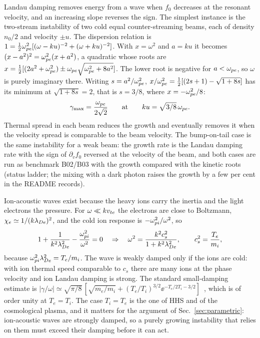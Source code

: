 Landau damping removes energy from a wave when $f_0$ decreases at the resonant velocity, and an increasing slope reverses the sign. The simplest instance is the two-stream instability of two cold equal counter-streaming beams, each of density $n_0/2$ and velocity $\pm u$. The dispersion relation is $1=\tfrac12\omega_{pe}^2[(\omega-ku)^{-2}+(\omega+ku)^{-2}]$. With $x=\omega^2$ and $a=ku$ it becomes $(x-a^2)^2=\omega_{pe}^2(x+a^2)$, a quadratic whose roots are $x=\tfrac12[(2a^2+\omega_{pe}^2)\pm\omega_{pe}\sqrt{\omega_{pe}^2+8a^2}]$. The lower root is negative for $a<\omega_{pe}$, so $\omega$ is purely imaginary there. Writing $s=a^2/\omega_{pe}^2$, $x/\omega_{pe}^2=\tfrac12[(2s+1)-\sqrt{1+8s}]$ has its minimum at $\sqrt{1+8s}=2$, that is $s=3/8$, where $x=-\omega_{pe}^2/8$:
\begin{equation}
\gamma_{\max}=\frac{\omega_{pe}}{2\sqrt2}\qquad\text{at}\qquad ku=\sqrt{3/8}\,\omega_{pe} .
\end{equation}
Thermal spread in each beam reduces the growth and eventually removes it when the velocity spread is comparable to the beam velocity. The bump-on-tail case is the same instability for a weak beam: the growth rate is the Landau damping rate with the sign of $\partial_vf_0$ reversed at the velocity of the beam, and both cases are run as benchmark B02/B03 with the growth compared with the kinetic roots (status ladder; the mixing with a dark photon raises the growth by a few per cent in the README records).

Ion-acoustic waves exist because the heavy ions carry the inertia and the light electrons the pressure. For $\omega\ll kv_{te}$ the electrons are close to Boltzmann, $\chi_e\simeq1/(k\lambda_{De})^2$, and the cold ion response is $-\omega_{pi}^2/\omega^2$, so
\begin{equation}
1+\frac{1}{k^2\lambda_{De}^2}-\frac{\omega_{pi}^2}{\omega^2}=0\quad\Rightarrow\quad\omega^2=\frac{k^2c_s^2}{1+k^2\lambda_{De}^2},\qquad c_s^2=\frac{T_e}{m_i},
\end{equation}
because $\omega_{pi}^2\lambda_{De}^2=T_e/m_i$. The wave is weakly damped only if the ions are cold: with ion thermal speed comparable to $c_s$ there are many ions at the phase velocity and ion Landau damping is strong. The standard small-damping estimate is $|\gamma/\omega|\simeq\sqrt{\pi/8}\,[\sqrt{m_e/m_i}+(T_e/T_i)^{3/2}\ee^{-T_e/2T_i-3/2}]$~\citep{Stix1992}, which is of order unity at $T_e=T_i$. The case $T_i=T_e$ is the one of HHS and of the cosmological plasma, and it matters for the argument of Sec.~\ref{sec:parametric}: ion-acoustic waves are strongly damped, so a purely growing instability that relies on them must exceed their damping before it can act.

